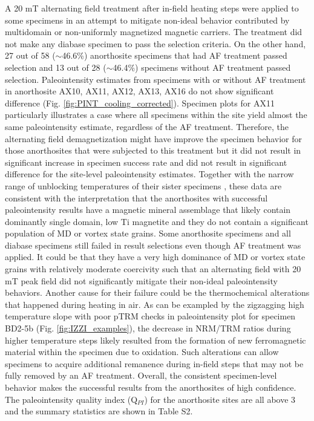 \documentclass[9pt,twocolumn,twoside,lineno]{pnas-new}
\begin{document}
A 20 mT alternating field treatment after in-field heating steps were applied to some specimens in an attempt to mitigate non-ideal behavior contributed by multidomain or non-uniformly magnetized magnetic carriers. The treatment did not make any diabase specimen to pass the selection criteria. On the other hand, 27 out of 58 ($\sim$46.6\%) anorthosite specimens that had AF treatment passed selection and 13 out of 28 ($\sim$46.4\%) specimens without AF treatment passed selection. Paleointensity estimates from specimens with or without AF treatment in anorthosite AX10, AX11, AX12, AX13, AX16 do not show significant difference (Fig. \ref{fig:PINT_cooling_corrected}). Specimen plots for AX11 particularly illustrates a case where all specimens within the site yield almost the same paleointensity estimate, regardless of the AF treatment. Therefore, the alternating field demagnetization might have improve the specimen behavior for those anorthosites that were subjected to this treatment but it did not result in significant increase in specimen success rate and did not result in significant difference for the site-level paleointensity estimates. Together with the narrow range of unblocking temperatures of their sister specimens \cite{Zhang2021b}, these data are consistent with the interpretation that the anorthosites with successful paleointensity results have a magnetic mineral assemblage that likely contain dominantly single domain, low Ti magnetite and they do not contain a significant population of MD or vortex state grains. Some anorthosite specimens and all diabase specimens still failed in result selections even though AF treatment was applied. It could be that they have a very high dominance of MD or vortex state grains with relatively moderate coercivity such that an alternating field with 20 mT peak field did not significantly mitigate their non-ideal paleointensity behaviors. Another cause for their failure could be the thermochemical alterations that happened during heating in air. As can be exampled by the zigzagging high temperature slope with poor pTRM checks in paleointensity plot for specimen BD2-5b (Fig. \ref{fig:IZZI_examples}), the decrease in NRM/TRM ratios during higher temperature steps likely resulted from the formation of new ferromagnetic material within the specimen due to oxidation. Such alterations can allow specimens to acquire additional remanence during in-field steps that may not be fully removed by an AF treatment. Overall, the consistent specimen-level behavior makes the successful results from the anorthosites of high confidence. The paleointensity quality index (Q$_{PI}$) for the anorthosite sites are all above 3 and the summary statistics are shown in Table S2. 
\end{document}
